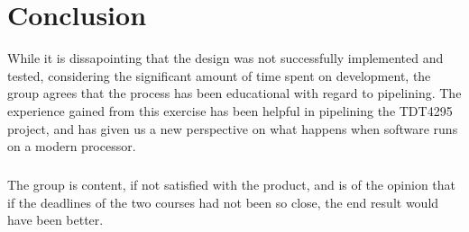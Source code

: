 \newpage
\chapter{Conclusion}
While it is dissapointing that the design was not successfully implemented and
tested, considering the significant amount of time spent on development, the 
group agrees that the process has been educational with regard to pipelining.
The experience gained from this exercise has been helpful in pipelining the 
TDT4295 project, and has given us a new perspective on what happens when 
software runs on a modern processor.
\paragraph*{}
The group is content, if not satisfied with the product, and is of the opinion 
that if the deadlines of the two courses had not been so close, the end result
would have been better.